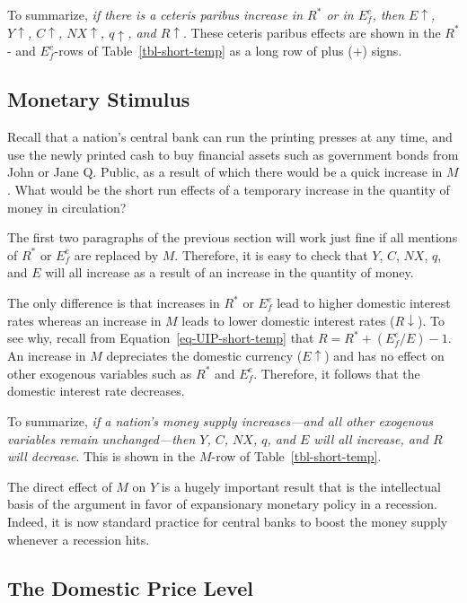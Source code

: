 \documentclass[
  letterpaper,
]{book}
\theoremstyle{plain}
\theoremstyle{remark}
\begin{document}
To summarize, \emph{if there is a ceteris paribus increase in \(R^*\) or
in \(E_f^e\), then \(E\uparrow\), \(Y\uparrow\), \(C\uparrow\),
\(NX\uparrow\), \(q\uparrow\), and \(R\uparrow\)}. These ceteris paribus
effects are shown in the \(R^*\)- and \(E_f^e\)-rows of
Table~\ref{tbl-short-temp} as a long row of plus (\(+\)) signs.

\subsection{Monetary Stimulus}\label{sec-money-short-temp}

Recall that a nation's central bank can run the printing presses at any
time, and use the newly printed cash to buy financial assets such as
government bonds from John or Jane Q. Public, as a result of which there
would be a quick increase in \(M\). What would be the short run effects
of a temporary increase in the quantity of money in circulation?

The first two paragraphs of the previous section will work just fine if
all mentions of \(R^*\) or \(E_f^e\) are replaced by \(M\). Therefore,
it is easy to check that \(Y\), \(C\), \(NX\), \(q\), and \(E\) will all
increase as a result of an increase in the quantity of money.

The only difference is that increases in \(R^*\) or \(E_f^e\) lead to
higher domestic interest rates whereas an increase in \(M\) leads to
lower domestic interest rates (\(R\downarrow\)). To see why, recall from
Equation~\ref{eq-UIP-short-temp} that \(R=R^*+(E^e_f/E)-1\). An increase
in \(M\) depreciates the domestic currency (\(E\uparrow\)) and has no
effect on other exogenous variables such as \(R^*\) and \(E_f^e\).
Therefore, it follows that the domestic interest rate decreases.

To summarize, \emph{if a nation's money supply increases---and all other
exogenous variables remain unchanged---then \(Y\), \(C\), \(NX\), \(q\),
and \(E\) will all increase, and \(R\) will decrease}. This is shown in
the \(M\)-row of Table~\ref{tbl-short-temp}.

The direct effect of \(M\) on \(Y\) is a hugely important result that is
the intellectual basis of the argument in favor of expansionary monetary
policy in a recession. Indeed, it is now standard practice for central
banks to boost the money supply whenever a recession hits.

\subsection{The Domestic Price Level}\label{sec-p-short-temp}
\end{document}
